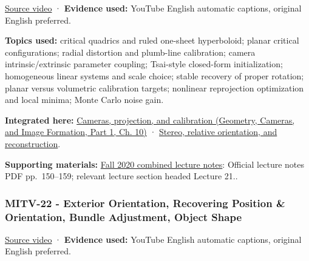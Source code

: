 \hypertarget{04-visual-computing-ii-ch036-mitv-21---relative-orientation-binocular-stereo-structure-quadrics-calibration-reprojection}{}

\href{https://www.youtube.com/watch?v=-n0cXgPSwOw}{Source video} · \textbf{Evidence used:} YouTube English automatic captions, original English preferred.

\textbf{Topics used:} critical quadrics and ruled one-sheet hyperboloid; planar critical configurations; radial distortion and plumb-line calibration; camera intrinsic/extrinsic parameter coupling; Tsai-style closed-form initialization; homogeneous linear systems and scale choice; stable recovery of proper rotation; planar versus volumetric calibration targets; nonlinear reprojection optimization and local minima; Monte Carlo noise gain.

\textbf{Integrated here:} \href{../03-Geometry-Cameras-and-Image-Formation-P01/main.pdf\#03-visual-computing-i-ch003-cameras-projection-and-calibration}{Cameras, projection, and calibration (Geometry, Cameras, and Image Formation, Part 1, Ch. 10)} · \hyperref[04-visual-computing-ii-ch032-stereo-relative-orientation-and-reconstruction]{Stereo, relative orientation, and reconstruction}.

\textbf{Supporting materials:} \href{https://ocw.mit.edu/courses/6-801-machine-vision-fall-2020/9ec44f69e72995c370b3797818ba01e6_MIT6_801F20_lectureNotes.pdf}{Fall 2020 combined lecture notes}: Official lecture notes PDF pp.~150--159; relevant lecture section headed Lecture 21..

\subsubsection{MITV-22 - Exterior Orientation, Recovering Position \& Orientation, Bundle Adjustment, Object Shape}\label{04-visual-computing-ii-ch036-mitv-22---exterior-orientation-recovering-position-orientation-bundle-adjustment-object-shape}

\hypertarget{04-visual-computing-ii-ch036-mitv-22---exterior-orientation-recovering-position-orientation-bundle-adjustment-object-shape}{}

\href{https://www.youtube.com/watch?v=x4F1oqm7ETk}{Source video} · \textbf{Evidence used:} YouTube English automatic captions, original English preferred.

